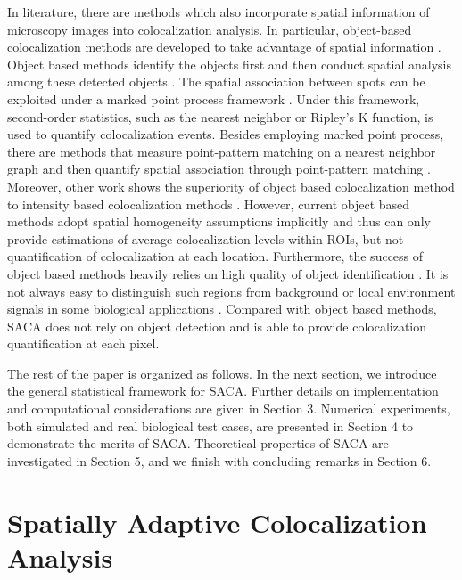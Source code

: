\documentclass[10pt,twocolumn,twoside]{IEEEtran}
\begin{document}
In literature, there are methods which also incorporate spatial information of microscopy images into colocalization analysis. In particular, object-based colocalization methods are developed to take advantage of spatial information \citep[see][]{Helmuth2010,zhang2008statistical,lagache2013statistical}. Object based methods identify the objects first and then conduct spatial analysis among these detected objects \citep[see][]{worz20103d,ruusuvuori2014quantitative,Lagache2015,moser2017fluorescence}. The spatial association between spots can be exploited under a marked point process framework \citep[see][]{illian2008statistical,Helmuth2010,lagache2013statistical,Lagache2015,lagache2018mapping}. Under this framework, second-order statistics, such as the nearest neighbor or Ripley's K function, is used to quantify colocalization events. Besides employing marked point process, there are methods that measure point-pattern matching on a nearest neighbor graph and then quantify spatial association through point-pattern matching \cite{ruusuvuori2014quantitative}. Moreover, other work shows the superiority of object based colocalization method to intensity based colocalization methods \cite{Lagache2015}. However, current object based methods adopt spatial homogeneity assumptions implicitly and thus can only provide estimations of average colocalization levels within ROIs, but not quantification of colocalization at each location. Furthermore, the success of object based methods heavily relies on high quality of object identification \citep[see][]{lagache2018mapping}. It is not always easy to distinguish such regions from background or local environment signals in some biological applications \citep[see][and Figure~\ref{fg:realdatatoy}]{pike2017quantifying}. Compared with object based methods, SACA does not rely on object detection and is able to provide colocalization quantification at each pixel. 

The rest of the paper is organized as follows. In the next section, we introduce the general statistical framework for SACA. Further details on implementation and computational considerations are given in Section 3. Numerical experiments, both simulated and real biological test cases, are presented in Section 4 to demonstrate the merits of SACA. Theoretical properties of SACA are investigated in Section 5, and we finish with concluding remarks in Section 6.

\section{Spatially Adaptive Colocalization Analysis}
\end{document}
